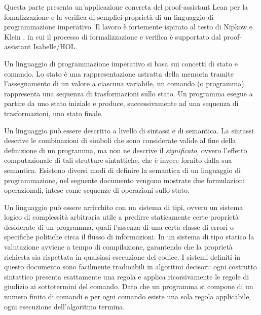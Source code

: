 Questa parte presenta un'applicazione concreta del proof-assistant Lean per la fomalizzazione e la verifica di semplici proprietà di un linguaggio di programmazione imperativo. Il lavoro è fortemente ispirato al testo di Nipkow e Klein \cite{concrete}, in cui il processo di formalizzazione e verifica è supportato dal proof-assistant Isabelle/HOL.

Un linguaggio di programmazione imperativo si basa sui concetti di stato e comando. Lo stato è una rappresentazione astratta della memoria tramite l'assegnamento di un valore a ciascuna variabile, un comando (o programma) rappresenta una sequenza di trasformazioni sullo stato. Un programma esegue a partire da uno stato iniziale e produce, successivamente ad una sequenza di trasformazioni, uno stato finale.

Un linguaggio può essere descritto a livello di sintassi e di semantica. La sintassi descrive le combinazioni di simboli che sono considerate valide al fine della definizione di un programma, ma non ne descrive il \emph{significato}, ovvero l'effetto computazionale di tali strutture sintattiche, che è invece fornito dalla sua semantica. Esistono diversi modi di definire la semantica di un linguaggio di programmazione, nel seguente documento vengono mostrate due formulazioni operazionali, intese come sequenze di operazioni sullo stato.

Un linguaggio può essere arricchito con un sistema di tipi, ovvero un sistema logico di complessità arbitraria utile a predirre staticamente certe proprietà desiderate di un programma, quali l'assenza di una certa classe di errori o specifiche politiche circa il flusso di informazioni. In un sistema di tipo statico la valutazione avviene a tempo di compilazione, garantendo che la proprietà richiesta sia rispettata in qualsiasi esecuzione del codice. I sistemi definiti in questo documento sono facilmente traducibili in algoritmi decisori: ogni costrutto sintattico presenta esattamente una regola e applica ricorsivamente le regole di giudizio ai sottotermini del comando. Dato che un programma si compone di un numero finito di comandi e per ogni comando esiste una sola regola applicabile, ogni esecuzione dell'algoritmo termina. 